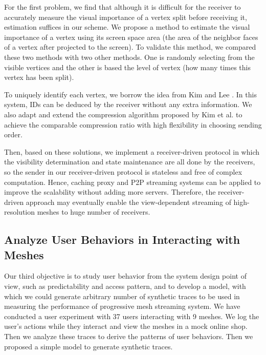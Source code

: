     For the first problem, we find that although it is difficult
    for the receiver to accurately measure
    the visual importance of a vertex split before receiving it, 
    estimation suffices in our scheme. 
    We propose a method to estimate the visual importance of a vertex
    using its screen space area (the area of the neighbor faces
    of a vertex after projected to the screen).
    To validate this method, we compared these two methods with two other
    methods. One is randomly selecting from the visible vertices and 
    the other is based the level of vertex (how many times this vertex
    has been split). 
    
    To uniquely identify each vertex, we borrow the idea from Kim and Lee \cite{kim01truly}.
    In this system, IDs can be deduced by the receiver without any extra information. 
    We also adapt and extend the compression algorithm proposed by Kim et al. \cite{multiresolution:kim}
    to achieve the comparable compression ratio with high flexibility in choosing 
    sending order.
    
    Then, based on these solutions, we implement a receiver-driven protocol in which 
    the visibility determination and state maintenance are all done by the receivers, so 
    the sender in our receiver-driven protocol is stateless and free of complex computation.
    Hence, caching proxy and P2P streaming systems can be applied to improve
    the scalability without adding more servers.  
    Therefore, the receiver-driven approach may eventually
    enable the view-dependent streaming of high-resolution meshes to huge number of receivers.
    
    \subsection{Analyze User Behaviors in Interacting with Meshes}
    Our third objective is to study user behavior from the system design point of view, 
    such as predictability and access pattern, and to develop a model, with which we
    could generate arbitrary number of synthetic traces to be used in measuring the performance
    of progressive mesh streaming system.
    We have conducted a user experiment with 37 users interacting with 9 meshes.
    We log the user's actions while they interact and view the meshes in a mock online shop.
    Then we analyze these traces to derive the patterns of user behaviors. Then we proposed
    a simple model to generate synthetic traces.

